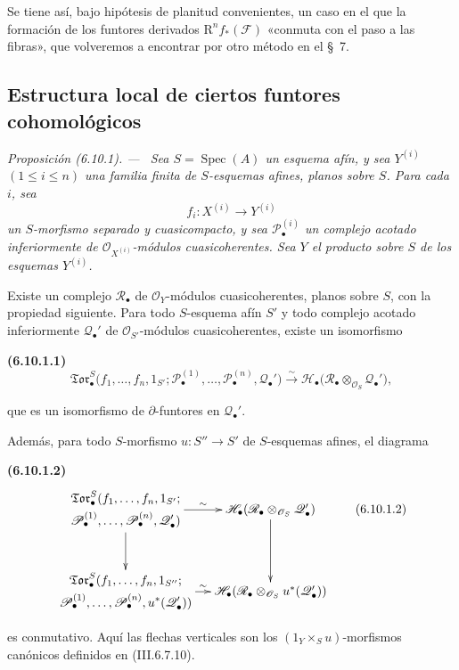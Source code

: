 \documentclass[10pt,oneside]{book}
\newcommand{\sh}[1]{\mathscr{#1}}
\newcommand{\Spec}{\operatorname{Spec}}
\newcommand{\sref}[2][]{\textup{(#2)}}
\newenvironment{env}[1][]{\par\medskip\noindent\textbf{(#1)}\ }{\par}
\newenvironment{proposition}[1][]{\par\medskip\noindent\itshape Proposición (#1). ---\ }{\par}
\begin{document}
Se tiene así, bajo hipótesis de planitud convenientes, un caso en el que la
formación de los funtores derivados $\mathrm R^nf_*(\mathscr F)$ «conmuta con el paso
a las fibras», que volveremos a encontrar por otro método en el §~7.

\subsection{Estructura local de ciertos funtores cohomológicos}
\label{subsection:III.6.10}
\label{III.6.10}

\begin{proposition}[6.10.1]
\label{III.6.10.1}
Sea $S=\Spec(A)$ un esquema afín, y sea $Y^{(i)}$
$(1\leq i\leq n)$ una familia finita de $S$-esquemas afines,
\textup{planos} sobre $S$. Para cada $i$, sea
\[
  f_i:X^{(i)}\longrightarrow Y^{(i)}
\]
un $S$-morfismo separado y cuasicompacto, y sea
$\sh P_\bullet^{(i)}$ un complejo acotado inferiormente de
$\sh O_{X^{(i)}}$-módulos cuasicoherentes. Sea $Y$ el producto
sobre $S$ de los esquemas $Y^{(i)}$.

Existe un complejo $\sh R_\bullet$ de $\sh O_Y$-módulos
cuasicoherentes, \textup{planos} sobre $S$, con la propiedad siguiente.
Para todo $S$-esquema afín $S'$ y todo complejo acotado
inferiormente $\sh Q_\bullet'$ de $\sh O_{S'}$-módulos
cuasicoherentes, existe un isomorfismo
\begin{env}[6.10.1.1]
\label{III.6.10.1.1}
\[
  \mathfrak{Tor}_\bullet^S
  \bigl(
    f_1,\ldots,f_n,1_{S'};
    \sh P_\bullet^{(1)},\ldots,\sh P_\bullet^{(n)},
    \sh Q_\bullet'
  \bigr)
  \xrightarrow{\sim}
  \sh H_\bullet
  \bigl(
    \sh R_\bullet\otimes_{\sh O_S}\sh Q_\bullet'
  \bigr),
  \tag{6.10.1.1}\label{III.6.10.1.1.eq}
\]
\end{env}
que es un isomorfismo de $\partial$-funtores en
$\sh Q_\bullet'$.

Además, para todo $S$-morfismo $u:S''\to S'$ de $S$-esquemas
afines, el diagrama
\begin{env}[6.10.1.2]
\label{III.6.10.1.2}
\[
\xymatrix@C=12pt@R=30pt{
  {\begin{gathered}
    \mathfrak{Tor}_\bullet^S
    (f_1,\ldots,f_n,1_{S'};\\
    \sh P_\bullet^{(1)},\ldots,\sh P_\bullet^{(n)},
    \sh Q_\bullet')
  \end{gathered}}
  \ar[r]^-{\sim}\ar[d]
  &
  {\sh H_\bullet
    (\sh R_\bullet\otimes_{\sh O_S}\sh Q_\bullet')}
  \ar[d]
  \\
  {\begin{gathered}
    \mathfrak{Tor}_\bullet^S
    (f_1,\ldots,f_n,1_{S''};\\
    \sh P_\bullet^{(1)},\ldots,\sh P_\bullet^{(n)},
    u^*(\sh Q_\bullet'))
  \end{gathered}}
  \ar[r]^-{\sim}
  &
  {\sh H_\bullet
    (\sh R_\bullet\otimes_{\sh O_S}u^*(\sh Q_\bullet'))}
}
\tag{6.10.1.2}\label{III.6.10.1.2.eq}
\]
\end{env}
es conmutativo. Aquí las flechas verticales son los
$(1_Y\times_Su)$-morfismos canónicos definidos en
\sref{III.6.7.10}.
\end{proposition}
\end{document}
